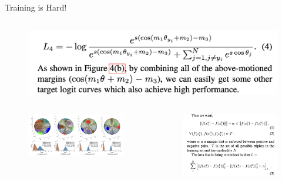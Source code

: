 \documentclass{zkdl-presentation-template}
\begin{document}
\begin{frame}{Training is Hard!}
\begin{columns}
            \begin{column}{0.35\textwidth}
                \begin{figure}
                    \centering
                    \includegraphics[width=\textwidth]{images/loss_2.png}
                \end{figure}
            \end{column}
        \end{columns}
        \begin{columns}
            \begin{column}{0.65\textwidth}
                \begin{figure}
                    \centering
                    \includegraphics[width=\textwidth]{images/loss_3.png}
                \end{figure}
            \end{column}
            \begin{column}{0.35\textwidth}
                \begin{figure}
                    \centering
                    \includegraphics[width=\textwidth]{images/loss_4.png}
                \end{figure}
            \end{column}
        \end{columns}


\end{frame}
\end{document}
